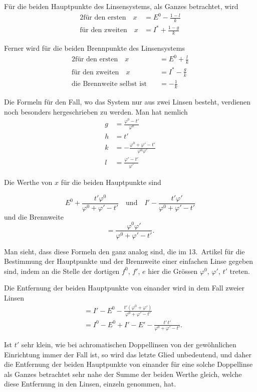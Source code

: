 \documentclass[11pt,a4paper]{article}
\begin{document}
Für die beiden Hauptpunkte des Linsensystems, als Ganzes betrachtet, wird
\begin{alignat*}{2}
\text{für den ersten} \quad x &= E^0 - \tfrac{1-l}{k} \\
\text{für den zweiten} \quad x &= I^* + \tfrac{1-g}{k}
\end{alignat*}

Ferner wird für die beiden Brennpunkte des Linsensystems
\begin{alignat*}{2}
\text{für den ersten} \quad x &= E^0 + \tfrac{l}{k} \\
\text{für den zweiten} \quad x &= I^* - \tfrac{g}{k} \\
\text{die Brennweite selbst ist} \quad &= -\tfrac{1}{k}
\end{alignat*}

Die Formeln für den Fall, wo das System nur aus zwei Linsen besteht, verdienen noch besonders hergeschrieben zu werden. Man hat nemlich
\begin{align*}
g &= \frac{\varphi^0 - t'}{\varphi^0} \\
h &= t' \\
k &= -\frac{\varphi^0 + \varphi' - t'}{\varphi^0 \varphi'} \\
l &= \frac{\varphi' - t'}{\varphi'}
\end{align*}

Die Werthe von $x$ für die beiden Hauptpunkte sind

\newpage
\noindent
\[
E^0 + \frac{t'\varphi^0}{\varphi^0 + \varphi' - t'} \quad \text{und} \quad I' - \frac{t'\varphi'}{\varphi^0 + \varphi' - t'}
\]
und die Brennweite
\[
= \frac{\varphi^0 \varphi'}{\varphi^0 + \varphi' - t'}.
\]

Man sieht, dass diese Formeln den ganz analog sind, die im 13.~Artikel für die Bestimmung der Hauptpunkte und der Brennweite einer einfachen Linse gegeben sind, indem an die Stelle der dortigen $f^0$, $f'$, $e$ hier die Grössen $\varphi^0$, $\varphi'$, $t'$ treten.

Die Entfernung der beiden Hauptpunkte von einander wird in dem Fall zweier Linsen
\begin{align*}
&= I' - E^0 - \frac{t'(\varphi^0 + \varphi')}{\varphi^0 + \varphi' - t'} \\
&= I^0 - E^0 + I' - E' - \frac{t'\,t'}{\varphi^0 + \varphi' - t'}.
\end{align*}

Ist $t'$ sehr klein, wie bei achromatischen Doppellinsen von der gewöhnlichen Einrichtung immer der Fall ist, so wird das letzte Glied unbedeutend, und daher die Entfernung der beiden Hauptpunkte von einander für eine solche Doppellinse als Ganzes betrachtet sehr nahe der Summe der beiden Werthe gleich, welche diese Entfernung in den Linsen, einzeln genommen, hat.
\end{document}
